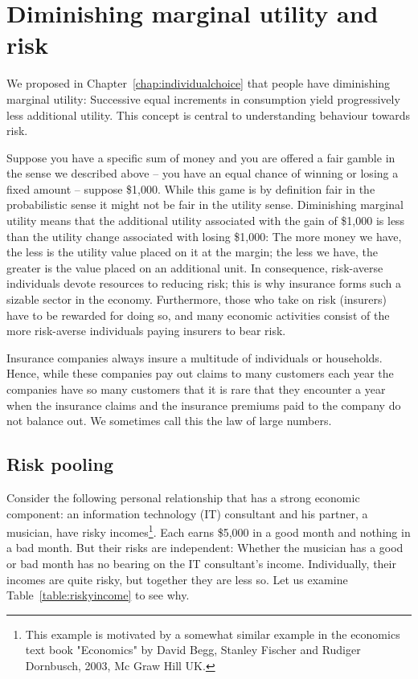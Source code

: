 \section{Diminishing marginal utility and risk}\label{sec:ch7sec4}

We proposed in Chapter~\ref{chap:individualchoice} that people have diminishing marginal utility: Successive equal increments in consumption yield progressively less additional utility. This concept is central to understanding behaviour towards risk.

Suppose you have a specific sum of money and you are offered a fair gamble in the sense we described above -- you have an equal chance of winning or losing a fixed amount -- suppose \$1,000. While this game is by definition fair in the probabilistic sense it might not be fair in the utility sense. Diminishing marginal utility means that the additional utility associated with the gain of \$1,000 is less than the utility change associated with losing \$1,000: The more money we have, the less is the utility value placed on it at the margin; the less we have, the greater is the value placed on an additional unit. In consequence, risk-averse individuals devote resources to reducing risk; this is why insurance forms such a sizable sector in the economy. Furthermore, those who take on risk (insurers) have to be rewarded for doing so, and many economic activities consist of the more risk-averse individuals paying insurers to bear risk.

Insurance companies always insure a multitude of individuals or households. Hence, while these companies pay out claims to many customers each year the companies have so many customers that it is rare that they encounter a year when the insurance claims and the insurance premiums paid to the company do not balance out. We sometimes call this the law of large numbers.

\subsection*{Risk pooling}

Consider the following personal relationship that has a strong economic component: an information technology (IT) consultant and his partner, a musician, have risky incomes\footnote{This example is motivated by a somewhat similar example in the economics text book "Economics" by David Begg, Stanley Fischer and Rudiger Dornbusch, 2003, Mc Graw Hill UK.}. Each earns \$5,000 in a good month and nothing in a bad month. But their risks are independent: Whether the musician has a good or bad month has no bearing on the IT consultant's income. Individually, their incomes are quite risky, but together they are less so. Let us examine Table~\ref{table:riskyincome} to see why.

